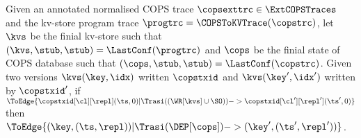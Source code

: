 \begin{proposition}
\label{prop:cops-dependency-set-to-causal}
Given an annotated normalised COPS trace \( \copsexttrc \in \ExtCOPSTraces \) and
the kv-store program trace \( \progtrc = \COPSToKVTrace(\copstrc) \),
let \( \kvs \) be the finial kv-store such that \( (\kvs,\stub,\stub) = \LastConf(\progtrc)\)
and \( \cops \) be the finial state of COPS database such that \( (\cops,\stub,\stub) = \LastConf(\copstrc)\).
Given two versions \( \kvs(\key,\idx) \) written \( \copstxid \) and \( \kvs(\key',\idx') \) written by \( \copstxid' \), 
if \( \ToEdge{\copstxid[\cl][\repl](\ts,0) | \Trasi((\WR[\kvs] \cup \SO )) -> \copstxid[\cl'][\repl'](\ts',0) } \)
then \( \ToEdge{( \key, (\ts,\repl) ) | \Trasi( \DEP[\cops] ) -> (\key', (\ts',\repl')) } \).
\end{proposition}
